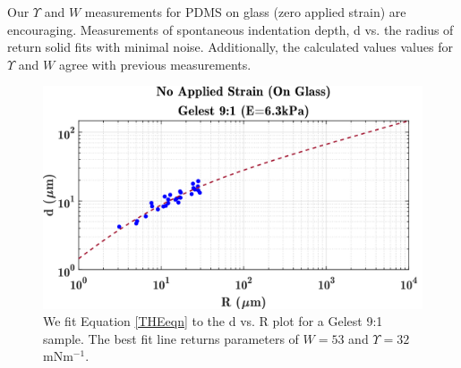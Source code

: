 Our $ \Upsilon $ and $ W $ measurements for PDMS on glass (zero applied strain) are encouraging. Measurements of spontaneous indentation depth, d vs. the radius of return solid fits with minimal noise. Additionally, the calculated values values for $ \Upsilon $ and $ W $ agree with previous measurements. 

\begin{figure}[h!]
	\centering
	\includegraphics[width=\linewidth]{Chapters/Figures/w_ups_fit_G9-1}
	\caption[Gelest W-$\Upsilon$ Fit]{We fit Equation \ref{THEeqn} to the d vs. R plot for a Gelest 9:1 sample. The best fit line returns parameters of $ W=53 $  and $ \Upsilon=32 $ mNm$^{-1}$.}
	\label{fig:wupsfitg9-1}
\end{figure}

